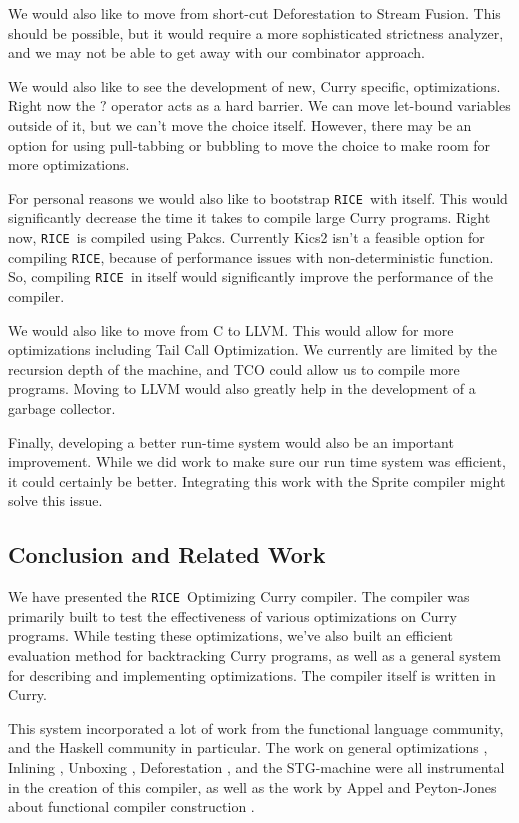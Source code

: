 \documentclass{book}
\newcommand{\rice}{\texttt{RICE}}
\newcommand{\ricesp}{\texttt{RICE }}
\theoremstyle{definition}
\begin{document}
We would also like to move from short-cut Deforestation to Stream Fusion.
This should be possible, but it would require a more sophisticated strictness analyzer,
and we may not be able to get away with our combinator approach.

We would also like to see the development of new, Curry specific, optimizations.
Right now the \ensuremath{\mathbin{?}} operator acts as a hard barrier.
We can move let-bound variables outside of it, but we can't move the choice itself.
However, there may be an option for using pull-tabbing or bubbling
to move the choice to make room for more optimizations.

For personal reasons we would also like to bootstrap \ricesp with itself.
This would significantly decrease the time it takes to compile large Curry programs.
Right now, \ricesp is compiled using Pakcs.
Currently Kics2 isn't a feasible option for compiling \rice,
because of performance issues with non-deterministic function.
So, compiling \ricesp in itself would significantly improve the performance of the compiler.

We would also like to move from C to LLVM.
This would allow for more optimizations including Tail Call Optimization.
We currently are limited by the recursion depth of the machine,
and TCO could allow us to compile more programs.
Moving to LLVM would also greatly help in the development of a garbage collector.

Finally, developing a better run-time system would also be an important improvement.
While we did work to make sure our run time system was efficient,
it could certainly be better.
Integrating this work with the Sprite \cite{sprite} compiler might solve this issue.

\subsection{Conclusion and Related Work}

We have presented the \ricesp Optimizing Curry compiler.
The compiler was primarily built to test the effectiveness of various optimizations on Curry programs.
While testing these optimizations, we've also built
an efficient evaluation method for backtracking Curry programs,
as well as a general system for describing and implementing optimizations.
The compiler itself is written in Curry.

This system incorporated a lot of work from the functional language community,
and the Haskell community in particular.
The work on general optimizations \cite{haskellOpt}, 
Inlining \cite{haskellInliner}, Unboxing \cite{unboxing},
Deforestation \cite{shortcutDeforestation}, and the STG-machine \cite{evalApply, stg} 
were all instrumental in the creation of this compiler,
as well as the work by Appel and Peyton-Jones about functional compiler construction 
 \cite{compilersAppel, continuationsAppel, lazyFunctionalCompilers}.
\end{document}
